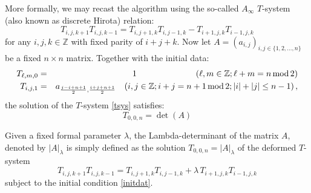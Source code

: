 \documentclass[12pt]{amsart}
\numberwithin{equation}{section}
\begin{document}
More formally, we may recast the algorithm using the so-called $A_\infty$ $T$-system 
(also known as discrete Hirota) relation:
\begin{equation}\label{tsys}
T_{i,j,k+1}T_{i,j,k-1}=T_{i,j+1,k}T_{i,j-1,k}-T_{i+1,j,k}T_{i-1,j,k}
\end{equation}
for any $i,j,k\in {{\mathbb Z}}$ with fixed parity of $i+j+k$. 
Now let $A=(a_{i,j})_{i,j\in \{1,2,...,n\}}$ be a fixed $n\times n$ matrix. Together with the initial data:
\begin{eqnarray}
T_{\ell,m,0}&=&1\quad \qquad \qquad\qquad (\ell,m\in {{\mathbb Z}};\ell+m=n\, {\rm mod}\, 2)\nonumber \\ 
T_{i,j,1}&=&a_{{j-i+n+1\over 2},{i+j+n+1\over 2}} \quad
(i,j\in{{\mathbb Z}};i+j=n+1\, {\rm mod}\, 2; |i|+|j|\leq n-1)\, ,\label{initdat}
\end{eqnarray}
the solution of the $T$-system \eqref{tsys} satisfies:
\begin{equation}
T_{0,0,n}=\det(A)
\end{equation}

Given a fixed formal parameter $\lambda$,
the Lambda-determinant of the matrix $A$, denoted by $\vert A\vert_\lambda$ is simply defined 
as the solution $T_{0,0,n}=\vert A\vert_\lambda$ of the deformed $T$-system
\begin{equation}\label{defoT} 
T_{i,j,k+1}T_{i,j,k-1}=T_{i,j+1,k}T_{i,j-1,k}+\lambda \, T_{i+1,j,k}T_{i-1,j,k}
\end{equation}
subject to the initial condition \eqref{initdat}.
\end{document}
